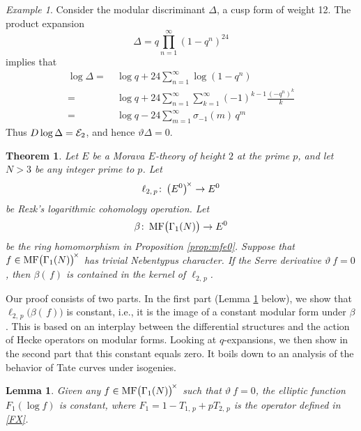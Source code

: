\documentclass{gtpart}
\newtheorem{thm}[equation]{Theorem}
\newtheorem{lem}[equation]{Lemma}
\theoremstyle{definition}
\theoremstyle{remark}
\newtheorem{ex}[equation]{Example}
\def\co{\colon\thinspace}
\newcommand{\CE}{{\cal E}}
\newcommand{\MF}{{\rm MF}}
\newcommand{\B}{\beta}
\renewcommand{\D}{\Delta}
\newcommand{\G}{\Gamma}
\newcommand{\si}{\sigma}
\renewcommand{\=}{\approx}
\renewcommand{\-}{\sim}
\numberwithin{equation}{section}
\begin{document}
\begin{ex}
 \label{ex:D}
 Consider the modular discriminant $\D$, a cusp form of weight 12.  The product 
 expansion 
 \[
  \D = q \prod_{n=1}^\infty (1 - q^n)^{24} 
 \]
 implies that 
 \begin{equation}
  \label{logD}
  \begin{split}
   \log \D = & ~ \log q + 24 \sum_{n = 1}^\infty \log(1 - q^n) \\
           = & ~ \log q + 24 \sum_{n = 1}^\infty \sum_{k = 1}^\infty 
               (-1)^{k - 1} \frac{(-q^n)^k}{k} \\
           = & ~ \log q - 24 \sum_{m = 1}^\infty \si_{-1}(m) \, q^{m} 
  \end{split}
 \end{equation}
 Thus $D \log \D = \CE_2$, and hence $\vartheta \D = 0$.  
\end{ex}

\begin{thm}
 \label{thm:kerlog}
 Let $E$ be a Morava $E$-theory of height $2$ at the prime $p$, and let $N > 3$ 
 be any integer prime to $p$.  Let 
 \[
  \ell_{2,\,p} \co \big( E^0 \big)^{\!\times} \to E^0 
 \]
 be Rezk's logarithmic cohomology operation.  Let 
 \[
  \B \co \MF\big(\G_1(N)\big) \to E^0 
 \]
 be the ring homomorphism in Proposition \ref{prop:mfe0}.  Suppose that \!\, 
 $f \in \MF\big(\G_1(N)\big)^{\!\times}$ has trivial Nebentypus character.  If 
 the Serre derivative $\vartheta ~\! f = 0$, then $\B(\,f)$ is contained in the 
 kernel of $\ell_{2,\,p}$.  
\end{thm}

Our proof consists of two parts.  In the first part (Lemma \ref{lem:const} 
below), we show that $\ell_{2,\,p}\big(\B(\,f)\big)$ is constant, i.e., it is 
the image of a constant modular form under $\B$.  This is based on an interplay 
between the differential structures and the action of Hecke operators on modular 
forms.  Looking at $q$-expansions, we then show in the second part that this 
constant equals zero.  It boils down to an analysis of the behavior of Tate 
curves under isogenies.  

\begin{lem}
 \label{lem:const}
 Given any $f \in \MF\big(\G_1(N)\big)^{\!\times}$ such that 
 $\vartheta ~\! f = 0$, the elliptic function $F_1(\log f)$ is constant, where 
 $F_1 = 1 - T_{1,\,p} + p T_{2,\,p}$ is the operator defined in \eqref{FX}.  
\end{lem}
\end{document}
